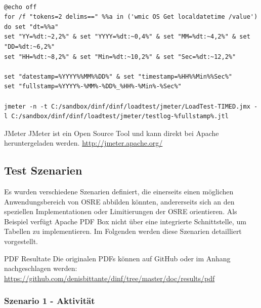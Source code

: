 \documentclass[main.tex]{subfiles}
\begin{document}
\begin{lstlisting}[language=command.com]
           
@echo off
for /f "tokens=2 delims==" %%a in ('wmic OS Get localdatetime /value') do set "dt=%%a"
set "YY=%dt:~2,2%" & set "YYYY=%dt:~0,4%" & set "MM=%dt:~4,2%" & set "DD=%dt:~6,2%"
set "HH=%dt:~8,2%" & set "Min=%dt:~10,2%" & set "Sec=%dt:~12,2%"

set "datestamp=%YYYY%%MM%%DD%" & set "timestamp=%HH%%Min%%Sec%"
set "fullstamp=%YYYY%-%MM%-%DD%_%HH%-%Min%-%Sec%"

jmeter -n -t C:/sandbox/dinf/dinf/loadtest/jmeter/LoadTest-TIMED.jmx -l C:/sandbox/dinf/dinf/loadtest/jmeter/testlog-%fullstamp%.jtl

\end{lstlisting}




\begin{reference}{JMeter}
JMeter ist ein Open Source Tool und kann direkt bei Apache heruntergeladen werden.  \newline
\url{http://jmeter.apache.org/}
\end{reference}



\subsection{Test Szenarien}
Es wurden verschiedene Szenarien definiert, die einerseits einen möglichen Anwendungsbereich von OSRE abbilden könnten, andererseits sich an den speziellen Implementationen oder Limitierungen der OSRE orientieren. Als Beispiel verfügt Apache PDF Box nicht über eine integrierte Schnittstelle, um Tabellen zu implementieren. Im Folgenden werden diese Szenarien detailliert vorgestellt. 


\begin{reference}{PDF Resultate}
 Die originalen PDFs können auf GitHub oder im Anhang nachgeschlagen werden: \url{https://github.com/denisbittante/dinf/tree/master/doc/results/pdf}
 
\end{reference}

\subsubsection{Szenario 1 - Aktivität}
\end{document}
